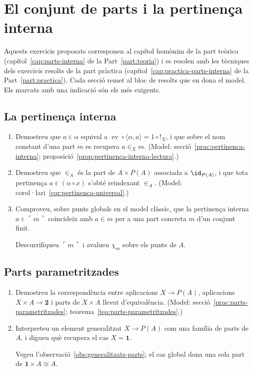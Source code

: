 \chapter{El conjunt de parts i la pertinença interna}\label{cap:exercicis-parts-interna}

Aquests exercicis proposats corresponen al capítol homònim de la part teòrica (capítol~\ref{cap:parts-interna} de la Part~\ref{part:teoria}) i es resolen amb les tècniques dels exercicis resolts de la part pràctica (capítol~\ref{cap:practica-parts-interna} de la Part~\ref{part:practica}). Cada secció remet al bloc de resolts que en dona el model. Els marcats amb una indicació són els més exigents.

\section{La pertinença interna}

\begin{enumerate}
  \item Demostreu que \(a\mathrel{\varepsilon}\alpha\) equival a \(\operatorname{ev}\circ\langle\alpha,a\rangle=1\circ{!}_X\), i que sobre el nom constant d'una part \(m\) es recupera \(a\in_X m\). (Model: secció~\ref{prac:pertinenca-interna}; proposició~\ref{prop:pertinenca-interna-lectura}.)

  \item Demostreu que \(\in_A\) és la part de \(A\times P(A)\) associada a \(\id_{P(A)}\), i que tota pertinença \(a\mathrel{\varepsilon}(\alpha\circ x)\) s'obté reindexant \(\in_A\). (Model: corol·lari~\ref{cor:pertinenca-universal}.)

  \item Comproveu, sobre punts globals en el model clàssic, que la pertinença interna \(a\mathrel{\varepsilon}\ulcorner m\urcorner\) coincideix amb \(a\in m\) per a una part concreta \(m\) d'un conjunt finit. \begin{indicacio}Descurrifiqueu \(\ulcorner m\urcorner\) i avalueu \(\chi_m\) sobre els punts de \(A\).\end{indicacio}
\end{enumerate}

\section{Parts parametritzades}

\begin{enumerate}[resume]
  \item Demostreu la correspondència entre aplicacions \(X\to P(A)\), aplicacions \(X\times A\to\mathbf2\) i parts de \(X\times A\) llevat d'equivalència. (Model: secció~\ref{prac:parts-parametritzades}; teorema~\ref{teo:parts-parametritzades}.)

  \item Interpreteu un element generalitzat \(X\to P(A)\) com una família de parts de \(A\), i digueu què recupera el cas \(X=\mathbf1\). \begin{indicacio}Vegeu l'observació~\ref{obs:generalitzats-parts}; el cas global dona una sola part de \(\mathbf1\times A\cong A\).\end{indicacio}
\end{enumerate}

